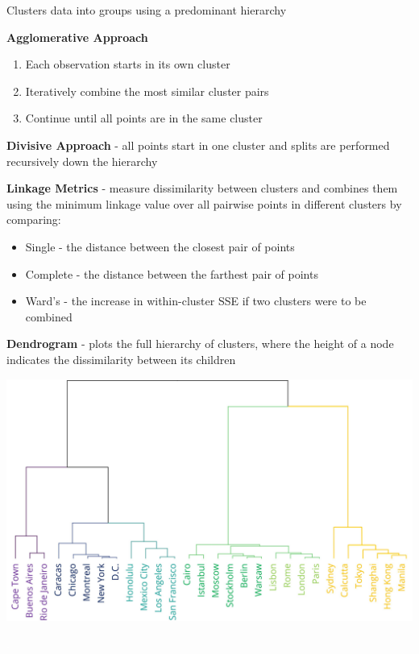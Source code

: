 \documentclass[10pt,landscape]{article}
\begin{document}
\begin{multicols}{3}
Clusters data into groups using a predominant hierarchy

\textbf{Agglomerative Approach}
\begin{enumerate}[leftmargin=5mm]
\itemsep -.4mm
\item Each observation starts in its own cluster
\item Iteratively combine the most similar cluster pairs
\item Continue until all points are in the same cluster
\end{enumerate}

\textbf{Divisive Approach} - all points start in one cluster and splits are performed recursively down the hierarchy

\textbf{Linkage Metrics} - measure dissimilarity between clusters and combines them using the minimum linkage value over all pairwise points in different clusters by comparing:
\begin{itemize}[label={--},leftmargin=4mm]
\itemsep -.4mm
\item Single - the distance between the closest pair of points
\item Complete - the distance between the farthest pair of points
\item Ward's - the increase in within-cluster SSE if two clusters were to be combined
\end{itemize}
\textbf{Dendrogram} - plots the full hierarchy of clusters, where the height of a node indicates the dissimilarity between its children
\begin{center}
    \includegraphics[scale = .1]{images/dendroedit3.JPG}
\end{center}

\columnbreak
\textcolor{white}{.}\vspace{-5mm}\\ %

\end{multicols}
\end{document}
